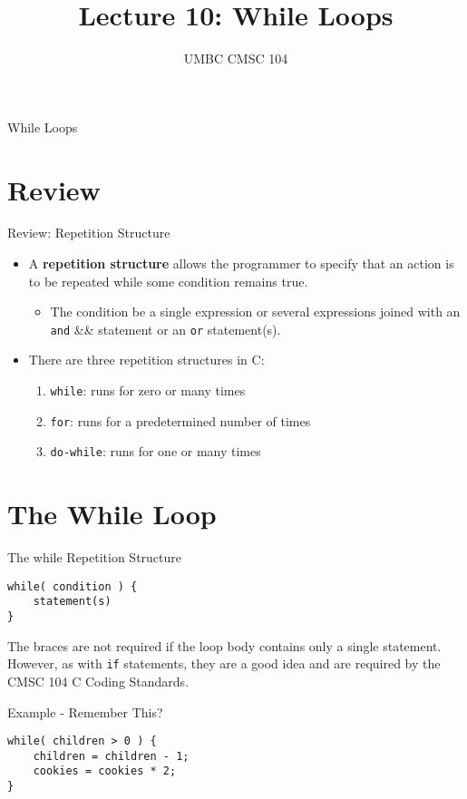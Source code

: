 \documentclass[graphics]{beamer}
\title{Lecture 10: While Loops}
\author{UMBC CMSC 104}
\date{}
\begin{document}
\begin{frame}{}
\centering
    While Loops
\end{frame}

\frame{\tableofcontents}

\section{Review}
\begin{frame}{Review: Repetition Structure}
    \begin{itemize}
        \item A \textbf{repetition structure} allows the programmer to specify that an action is to be repeated while some condition remains true.
        \begin{itemize}
            \item The condition be a single expression or several expressions joined with an \texttt{and} \&\& statement or an \texttt{or} \textbar\textbar statement(s). 
        \end{itemize}
        \item There are three repetition structures in C:
        \begin{enumerate}
            \item \texttt{while}: runs for zero or many times
            \item \texttt{for}: runs for a predetermined number of times
            \item \texttt{do-while}: runs for one or many times
        \end{enumerate}
    \end{itemize}
\end{frame}

\section{The While Loop}
\begin{frame}[fragile]{The while Repetition Structure}
\begin{verbatim}
while( condition ) {
    statement(s)
}
\end{verbatim}
The braces are not required if the loop body contains only a single statement. However, as with \texttt{if} statements, they are a good idea and are required by the CMSC 104 C Coding Standards.
\end{frame}

\begin{frame}[fragile]{Example - Remember This?}
\begin{verbatim}
while( children > 0 ) {
    children = children - 1;
    cookies = cookies * 2;
}
\end{verbatim}
\end{frame}
\end{document}
